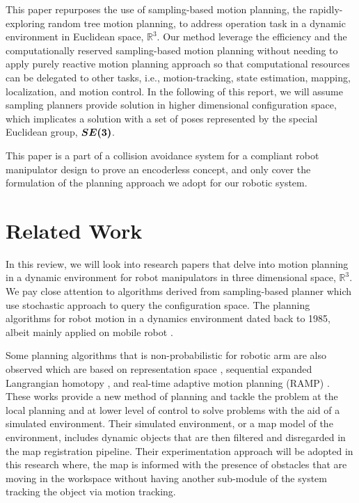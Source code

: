 \documentclass[a4paper, 10pt]{article}
\numberwithin{equation}{section} %
\begin{document}

 


This paper repurposes the use of sampling-based motion planning, the
rapidly-exploring random tree motion planning, 
to address operation task in a dynamic environment in 
Euclidean space, $\mathbb{R}^3$. Our method 
leverage the efficiency and the computationally reserved 
sampling-based motion planning without needing to apply purely reactive
motion planning approach so that computational resources can 
be delegated to other tasks, i.e., motion-tracking, state estimation, 
mapping, localization, and motion control. 
In the following of this report, we will assume sampling 
planners provide
solution in higher dimensional configuration space, which implicates
a solution with a set of poses represented by the special Euclidean group,
$\vb*{SE(3)}$.

This paper is a part of a collision avoidance system for a compliant
robot manipulator design to prove an encoderless concept, and only
cover the formulation of the planning approach we adopt for our 
robotic system. 

\section{Related Work}

In this review, we will look into research papers 
that delve 
into motion planning in a dynamic environment for robot manipulators in three
dimensional space, $\mathbb{R}^3$. We pay close attention to 
algorithms derived from sampling-based planner which use stochastic
approach to query the configuration space. 
The planning algorithms for robot motion in a dynamics environment
dated back to 1985, albeit mainly applied on
mobile robot \parencite{Mohanan2018}. 

Some planning algorithms that is non-probabilistic 
for robotic arm 
are also observed which are
based on 
representation space \parencite{Su2011,Liu2016a}, 
sequential expanded Langrangian homotopy \parencite{Dharmawan2018a}, and
real-time adaptive motion planning (RAMP) \parencite{Vannoy2008}. These 
works provide a new method of planning and tackle
the problem at the local planning and at lower level of control to 
solve problems with the aid of a simulated environment. 
Their simulated
environment, or a map model of the environment, includes dynamic objects
that are then filtered and disregarded in the map registration pipeline.
Their experimentation approach will be adopted in this 
research where, the map is informed
with the presence of obstacles that are moving in the workspace without
having another sub-module of the system tracking the object via 
motion tracking.
\end{document}
